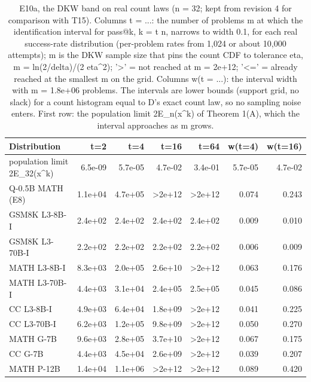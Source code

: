 \begin{table}[t]
\centering
\small
\begin{tabular}{lrrrrrr}
\toprule
Distribution & t=2 & t=4 & t=16 & t=64 & w(t=4) & w(t=16) \\
\midrule
population limit 2E\_32(x^k) & 6.5e-09 & 5.7e-05 & 4.7e-02 & 3.4e-01 & 5.7e-05 & 4.7e-02 \\
Q-0.5B MATH (E8) & 1.1e+04 & 4.7e+05 & >2e+12 & >2e+12 & 0.074 & 0.243 \\
GSM8K L3-8B-I & 2.4e+02 & 2.4e+02 & 2.4e+02 & 2.4e+02 & 0.009 & 0.010 \\
GSM8K L3-70B-I & 2.2e+02 & 2.2e+02 & 2.2e+02 & 2.2e+02 & 0.006 & 0.009 \\
MATH L3-8B-I & 8.3e+03 & 2.0e+05 & 2.6e+10 & >2e+12 & 0.063 & 0.176 \\
MATH L3-70B-I & 4.4e+03 & 3.1e+04 & 2.4e+05 & 2.5e+05 & 0.045 & 0.086 \\
CC L3-8B-I & 4.9e+03 & 6.4e+04 & 1.8e+09 & >2e+12 & 0.041 & 0.225 \\
CC L3-70B-I & 6.2e+03 & 1.2e+05 & 9.8e+09 & >2e+12 & 0.050 & 0.270 \\
MATH G-7B & 9.6e+03 & 2.8e+05 & 3.7e+10 & >2e+12 & 0.067 & 0.175 \\
CC G-7B & 4.4e+03 & 4.5e+04 & 2.6e+09 & >2e+12 & 0.039 & 0.207 \\
MATH P-12B & 1.4e+04 & 1.1e+06 & >2e+12 & >2e+12 & 0.089 & 0.420 \\
\bottomrule
\end{tabular}
\caption{E10a, the DKW band on real count laws (n = 32; kept from revision 4 for comparison with T15). Columns t = ...: the number of problems m at which the identification interval for pass@k, k = t n, narrows to width 0.1, for each real success-rate distribution (per-problem rates from 1,024 or about 10,000 attempts); m is the DKW sample size that pins the count CDF to tolerance eta, m = ln(2/delta)/(2 eta^2); '>' = not reached at m = 2e+12; '<=' = already reached at the smallest m on the grid. Columns w(t = ...): the interval width with m = 1.8e+06 problems. The intervals are lower bounds (support grid, no slack) for a count histogram equal to D's exact count law, so no sampling noise enters. First row: the population limit 2E\_n(x^k) of Theorem 1(A), which the interval approaches as m grows.}
\label{tab:T15b_dkw_band_vs_benchmark_size}
\end{table}
